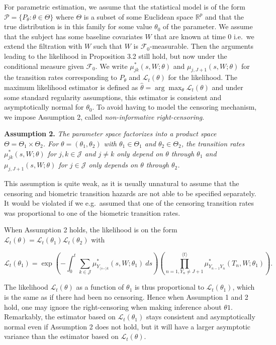 \documentclass[a4paper,10pt,openany]{book}
\begin{document}
For parametric estimation, we assume that the statistical model is of the form \(\mathcal P = \{P_\theta : \theta\in\Theta\}\) where \(\Theta\) is a subset of some Euclidean space \(\mathbb R^p\) and that the true distribution is in this family for some value \(\theta_0\) of the parameter. We assume that the subject has some baseline covariates \(W\) that are known at time 0 i.e.~we extend the filtration with \(W\) such that \(W\) is \(\mathcal F_0\)-measurable. Then the arguments leading to the likelihood in Proposition 3.2 still hold, but now under the conditional measure given \(\mathcal F_0\). We write \(\mu^*_{jk}(s,W;\theta)\) and \(\mu_{j,J+1}(s,W;\theta)\) for the transition rates corresponding to \(P_\theta\) and \(\mathcal L_t(\theta)\) for the likelihood. The maximum likelihood estimator is defined as \(\hat θ= \arg\max_\theta \mathcal L_t(\theta)\) and under some standard regularity assumptions, this estimator is consistent and asymptotically normal for \(\theta_0\). To avoid having to model the censoring mechanism, we impose Assumption 2, called \emph{non-informative right-censoring}.

\textbf{Assumption 2.} \emph{The parameter space factorizes into a product space \(\Theta = \Theta_1 \times \Theta_2\). For \(\theta = (\theta_1,\theta_2)\) with \(\theta_1 \in\Theta_1\) and \(\theta_2 \in\Theta_2\), the transition rates \(\mu^*_{jk}(s,W;\theta)\) for \(j,k \in\mathcal J\) and \(j\ne k\) only depend on \(\theta\) through \(\theta_1\) and \(\mu_{j,J+1}(s,W;\theta)\) for \(j \in\mathcal J\) only depends on \(\theta\) through \(\theta_2\).}

This assumption is quite weak, as it is usually unnatural to assume that the censoring and biometric transition hazards are not able to be specified separately. It would be violated if we e.g.~assumed that one of the censoring transition rates was proportional to one of the biometric transition rates.

When Assumption 2 holds, the likelihood is on the form \(\mathcal L_t(\theta) = \mathcal L_t(\theta_1) \mathcal L_t(\theta_2)\) with

\[
\mathcal L_t(\theta_1)= \exp\left(-\int_0^t  \sum_{k\in\mathcal J}\mu^*_{Y_{\langle s-\rangle k}}(s,W;\theta_1)\ ds\right)\left(\prod_{n=1,Y_n\ne J+1}^{\langle t\rangle}  \mu^*_{Y_{n-1}Y_n}(T_n,W;\theta_1)\right).
\]

The likelihood \(\mathcal L_t(\theta)\) as a function of \(\theta_1\) is thus proportional to \(\mathcal L_t(\theta_1)\), which is the same as if there had been no censoring. Hence when Assumption 1 and 2 hold, one may ignore the right-censoring when making inference about \(\theta 1\). Remarkably, the estimator based on \(\mathcal L_t(\theta_1)\) stays consistent and asymptotically normal even if Assumption 2 does not hold, but it will have a larger asymptotic variance than the estimator based on \(\mathcal L_t(\theta)\).
\end{document}
